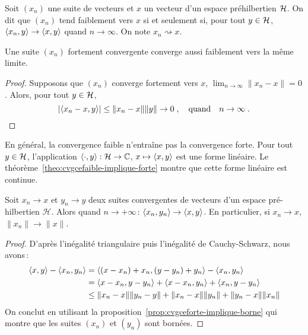 \begin{definition}
Soit $(x_n)$ une suite de vecteurs  et $x$ un vecteur d'un espace
pr\'{e}hilbertien $\mathcal{H}$. On dit que $(x_n)$ tend faiblement
vers $x$ si et seulement si, pour tout $y \in \mathcal{H}$, $\left\langle x_n, y \right\rangle \to \left\langle x, y \right\rangle$ quand $n \to \infty$.
On note $x_n \rightsquigarrow x$.
\end{definition}
\begin{theorem}
\label{theo:cvgcefaible-implique-forte}
Une suite $(x_n)$ fortement convergente converge aussi faiblement vers la m\^{e}me limite.
\end{theorem}
\begin{proof}
Supposons que $(x_n)$ converge fortement vers $x$, $\lim_{n \to \infty} \| x_n-x\|=0$. Alors,
pour tout $y \in \mathcal{H}$,
\[
\left| \left\langle x_n-x, y \right\rangle \right| \leq \| x_n - x \| \| y \| \to 0 \;, \quad \text{quand} \quad n \to \infty \;.
\]

\end{proof}
En g\'{e}n\'{e}ral, la convergence faible n'entra\^{i}ne pas la convergence forte.
Pour tout $y \in \mathcal{H}$, l'application $\left\langle \cdot, y \right\rangle: \mathcal{H} \to \mathbb{C}$, $x \mapsto \left\langle x, y \right\rangle$ est une forme
lin\'{e}aire. Le th\'{e}or\`{e}me~\ref{theo:cvgcefaible-implique-forte} montre que cette forme lin\'{e}aire est continue.
\begin{theorem}
\label{theo:cont_prod_int} Soit $x_n \rightarrow x$ et $y_n
\rightarrow y$ deux suites convergentes de vecteurs d'un espace
pr\'{e}-hilbertien $\mathcal{H}$. Alors quand $n\rightarrow
+\infty$\,: $\left\langle x_n, y_n \right\rangle \rightarrow \left\langle x, y \right\rangle$. En particulier, si $x_n
\rightarrow x$, $\| x_n \| \rightarrow \|x\|$.
\end{theorem}
\begin{proof}
D'apr\`{e}s l'in\'{e}galit\'{e} triangulaire puis l'in\'{e}galit\'{e} de Cauchy-Schwarz,
nous avons\,:
\begin{align*}
\left\langle x, y \right\rangle-\left\langle x_n, y_n \right\rangle
 &= \left\langle (x - x_n) + x_n,  (y - y_n) + y_n \right\rangle - \left\langle x_n, y_n \right\rangle \\
 &= \left\langle x-x_n, y-y_n \right\rangle + \left\langle x-x_n, y_n \right\rangle+ \left\langle x_n, y-y_n \right\rangle \\
 &\leq \|x_n-x\|\|y_n-y\|+\|x_n-x\|\|y_n\|+\|y_n-x\|\|x_n\|
\end{align*}
On conclut en utilisant la proposition~\ref{prop:cvgceforte-implique-borne} qui montre que
les suites $(x_n)$ et $(y_n)$ sont born\'{e}es.

\end{proof}


